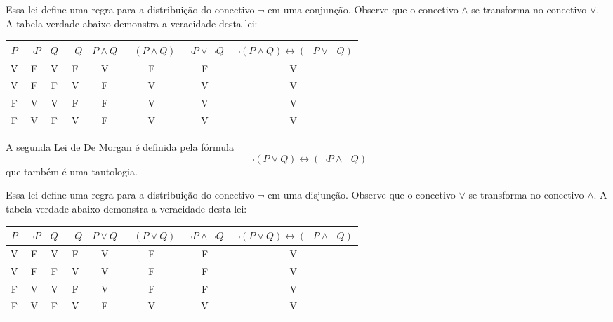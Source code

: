  \vskip0.3cm

 Essa lei define uma regra para a distribuição do conectivo $\neg$ em uma conjunção. Observe que o conectivo $\land$ se transforma no conectivo $\lor$. A tabela verdade abaixo demonstra a veracidade desta lei:

 \begin{table}[H]
 \centering
 \begin{tabular}{|c|c|c|c|c|c|c|c|} \hline
 \rowcolor{cinza}
 $P$ & $\neg P$ & $Q$ & $\neg Q$ & $P \land Q$ & $\neg (P \land Q)$ & $\neg P \lor \neg Q$ & $\neg(P \land Q) \leftrightarrow (\neg P \lor \neg Q)$ \\ \hline
 V & F & V & F & V & F & F & V \\ \hline
 V & F & F & V & F & V & V & V \\ \hline
 F & V & V & F & F & V & V & V \\ \hline
 F & V & F & V & F & V & V & V \\ \hline
 \end{tabular}
 \end{table}

 \colorbox{azul}{
 \begin{minipage}{14cm}
 \begin{center}
 A segunda Lei de De Morgan é definida pela fórmula
 \[\neg(P \lor Q) \leftrightarrow (\neg P \land \neg Q)\]
 que também é uma tautologia.
 \end{center}
 \end{minipage}}

 \vskip0.3cm

 Essa lei define uma regra para a distribuição do conectivo $\neg$ em uma disjunção. Observe que o conectivo $\lor$ se transforma no conectivo $\land$. A tabela verdade abaixo demonstra a veracidade desta lei:

 \begin{table}[H]
 \centering
 \begin{tabular}{|c|c|c|c|c|c|c|c|} \hline
 \rowcolor{cinza}
 $P$ & $\neg P$ & $Q$ & $\neg Q$ & $P \lor Q$ & $\neg (P \lor Q)$ & $\neg P \land \neg Q$ & $\neg(P \lor Q) \leftrightarrow (\neg P \land \neg Q)$ \\ \hline
 V & F & V & F & V & F & F & V \\ \hline
 V & F & F & V & V & F & F & V \\ \hline
 F & V & V & F & V & F & F & V \\ \hline
 F & V & F & V & F & V & V & V \\ \hline
 \end{tabular}
\end{table}

